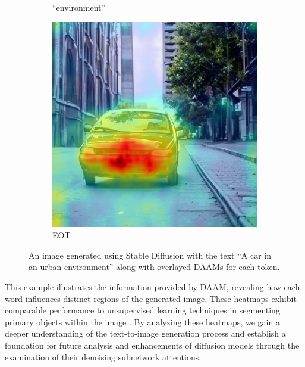\begin{figure}
\begin{subfigure}{0.32\columnwidth}
   \caption{``environment''}
   \label{fig:daam-example-image-7}
  \end{subfigure}
  \begin{subfigure}{0.32\columnwidth}
   \includegraphics[width=\columnwidth]{img/3-methodology/example_daam_heatmap_EoT.png}
   \caption{\textlangle EOT\textrangle}
   \label{fig:daam-example-image-8}
   \end{subfigure}
  \caption[Example of Diffusion Attentive Attribution Maps]{An image generated using Stable Diffusion with the text ``A car in an urban environment'' along with overlayed DAAMs for each token.}
  \label{fig:daam-example}
  \end{figure}



This example illustrates the information provided by DAAM, revealing how each word influences distinct regions of the generated image. These heatmaps exhibit comparable performance to unsupervised learning techniques in segmenting primary objects within the image \cite{DAAM}. By analyzing these heatmaps, we gain a deeper understanding of the text-to-image generation process and establish a foundation for future analysis and enhancements of diffusion models through the examination of their denoising subnetwork attentions.

